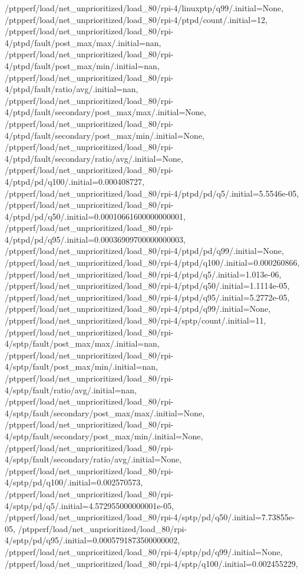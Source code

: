 {    /ptpperf/load/net_unprioritized/load_80/rpi-4/linuxptp/q99/.initial=None,
    /ptpperf/load/net_unprioritized/load_80/rpi-4/ptpd/count/.initial=12,
    /ptpperf/load/net_unprioritized/load_80/rpi-4/ptpd/fault/post_max/max/.initial=nan,
    /ptpperf/load/net_unprioritized/load_80/rpi-4/ptpd/fault/post_max/min/.initial=nan,
    /ptpperf/load/net_unprioritized/load_80/rpi-4/ptpd/fault/ratio/avg/.initial=nan,
    /ptpperf/load/net_unprioritized/load_80/rpi-4/ptpd/fault/secondary/post_max/max/.initial=None,
    /ptpperf/load/net_unprioritized/load_80/rpi-4/ptpd/fault/secondary/post_max/min/.initial=None,
    /ptpperf/load/net_unprioritized/load_80/rpi-4/ptpd/fault/secondary/ratio/avg/.initial=None,
    /ptpperf/load/net_unprioritized/load_80/rpi-4/ptpd/pd/q100/.initial=0.000408727,
    /ptpperf/load/net_unprioritized/load_80/rpi-4/ptpd/pd/q5/.initial=5.5546e-05,
    /ptpperf/load/net_unprioritized/load_80/rpi-4/ptpd/pd/q50/.initial=0.00010661600000000001,
    /ptpperf/load/net_unprioritized/load_80/rpi-4/ptpd/pd/q95/.initial=0.00036909700000000003,
    /ptpperf/load/net_unprioritized/load_80/rpi-4/ptpd/pd/q99/.initial=None,
    /ptpperf/load/net_unprioritized/load_80/rpi-4/ptpd/q100/.initial=0.000260866,
    /ptpperf/load/net_unprioritized/load_80/rpi-4/ptpd/q5/.initial=1.013e-06,
    /ptpperf/load/net_unprioritized/load_80/rpi-4/ptpd/q50/.initial=1.1114e-05,
    /ptpperf/load/net_unprioritized/load_80/rpi-4/ptpd/q95/.initial=5.2772e-05,
    /ptpperf/load/net_unprioritized/load_80/rpi-4/ptpd/q99/.initial=None,
    /ptpperf/load/net_unprioritized/load_80/rpi-4/sptp/count/.initial=11,
    /ptpperf/load/net_unprioritized/load_80/rpi-4/sptp/fault/post_max/max/.initial=nan,
    /ptpperf/load/net_unprioritized/load_80/rpi-4/sptp/fault/post_max/min/.initial=nan,
    /ptpperf/load/net_unprioritized/load_80/rpi-4/sptp/fault/ratio/avg/.initial=nan,
    /ptpperf/load/net_unprioritized/load_80/rpi-4/sptp/fault/secondary/post_max/max/.initial=None,
    /ptpperf/load/net_unprioritized/load_80/rpi-4/sptp/fault/secondary/post_max/min/.initial=None,
    /ptpperf/load/net_unprioritized/load_80/rpi-4/sptp/fault/secondary/ratio/avg/.initial=None,
    /ptpperf/load/net_unprioritized/load_80/rpi-4/sptp/pd/q100/.initial=0.002570573,
    /ptpperf/load/net_unprioritized/load_80/rpi-4/sptp/pd/q5/.initial=4.572955000000001e-05,
    /ptpperf/load/net_unprioritized/load_80/rpi-4/sptp/pd/q50/.initial=7.73855e-05,
    /ptpperf/load/net_unprioritized/load_80/rpi-4/sptp/pd/q95/.initial=0.0005791873500000002,
    /ptpperf/load/net_unprioritized/load_80/rpi-4/sptp/pd/q99/.initial=None,
    /ptpperf/load/net_unprioritized/load_80/rpi-4/sptp/q100/.initial=0.002455229,
}
